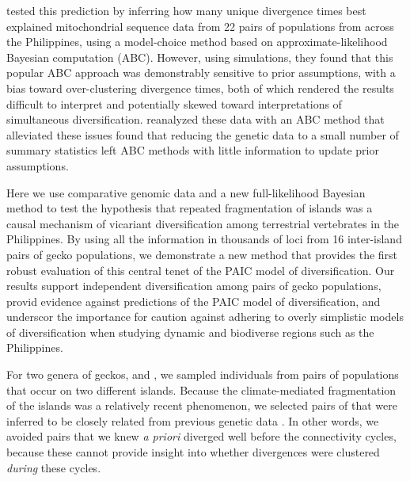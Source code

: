 \citet{Oaks2012}  tested this prediction  by inferring how many unique
divergence times best explained mitochondrial sequence data from 22 pairs of
populations from across the Philippines, using a model-choice method based on
approximate-likelihood Bayesian computation (ABC).
However, using simulations, they found that this popular ABC approach was
demonstrably sensitive to prior assumptions, with a bias toward over-clustering
divergence times, both of which rendered the results difficult to interpret
and potentially skewed toward interpretations of simultaneous diversification.
\citet{Oaks2014dpp} reanalyzed these data with an ABC method that alleviated
these issues found that reducing the genetic data to a small
number of summary statistics left ABC methods with little information to update
prior assumptions.

Here we use comparative genomic data and a new full-likelihood Bayesian method
to test the hypothesis that repeated fragmentation of islands was a causal
mechanism of vicariant diversification among terrestrial vertebrates in the
Philippines.
By using all the information in thousands of loci from 16 inter-island
pairs of gecko populations,
we demonstrate a new method that provides the first robust evaluation of
this central tenet of the PAIC model of diversification.
Our results support independent diversification among pairs of gecko
populations,
provid evidence against  predictions of
the PAIC model of diversification,
and underscor the importance for caution against adhering to
overly simplistic models of diversification  when studying dynamic and biodiverse regions such as the
Philippines.



For two genera of geckos,  and , we sampled
individuals from pairs of populations that occur on two different islands.
Because the climate-mediated fragmentation of the islands was a relatively
recent phenomenon, we selected  pairs of
 that were inferred to be closely related
from previous genetic data
\citep{Siler2010, Siler2012, Siler2014kikuchii, Welton2010zootaxa, Welton2010}.
In other words, we avoided pairs that we knew \emph{a priori} diverged well
before the connectivity cycles, because these cannot provide insight into
whether divergences were clustered \emph{during} these cycles.


